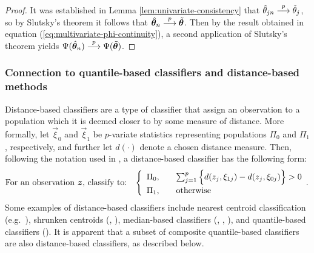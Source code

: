 \begin{proof}
  It was established in Lemma \ref{lem:univariate-consistency} that
  $\hat{\theta}_{jn} \stackrel{p}{\longrightarrow} \tilde{\theta}_j$, so by Slutsky's theorem
  it follows that $\hat{\bm{\theta}}_n \stackrel{p}{\longrightarrow} \tilde{\bm{\theta}}$.
  Then by the result obtained in equation
  (\ref{eq:multivariate-phi-continuity}), a second application of Slutsky's
  theorem yields
  $\Psi(\hat{\bm{\theta}}_n) \stackrel{p}{\longrightarrow} \Psi(\tilde{\bm{\theta}})$.
\end{proof}



\subsubsection{Connection to quantile-based classifiers and distance-based
  methods }
\label{sec:similarities-to-existing}

Distance-based classifiers are a type of classifier that assign an observation
to a population which it is deemed closer to by some measure of distance.  More
formally, let $\vec{\xi}_0$ and $\vec{\xi}_1$ be $p$-variate statistics
representing populations $\Pi_0$ and $\Pi_1$, respectively, and further let
$d(\cdot)$ denote a chosen distance measure. Then, following the notation used
in \cite{hennig2016}, a distance-based classifier has the following form:
\begin{equation}
  \label{eq:distance-based-classifier}
  \text{For an observation $\vec{z}$, classify to:}  \hspace{3mm}
  \left\{
    \begin{array}{lll}
      \Pi_0, & & \sum_{j=1}^p
                 \Big\{
                 d(z_j, \xi_{1j}) - d(z_j, \xi_{0j})
                 \Big\} > 0 \\[1ex]
      \Pi_1, & & \text{otherwise}
    \end{array}.
  \right.
\end{equation}
Some examples of distance-based classifiers include nearest centroid
classification (e.g.\ \cite{hastie2009}), shrunken centroids
(\cite{tibshirani2002}, \cite{wang2007}), median-based classifiers
(\cite{jornsten2004}, \cite{ghosh2005}, \cite{hall2012}), and quantile-based
classifiers (\cite{hennig2016}).  It is apparent that a subset of composite
quantile-based classifiers are also distance-based classifiers, as described
below.


